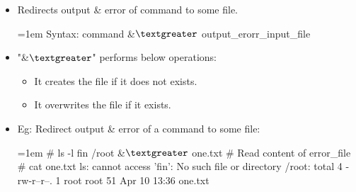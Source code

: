 \setlength{\columnsep}{3pt}
\begin{flushleft}

	\begin{itemize}
	\item Redirects output \& error of command to some file.
	\bigskip
	\begin{tcolorbox}[breakable,notitle,boxrule=-0pt,colback=pink,colframe=pink]
		\color{black}
		\font=1em
		Syntax: command \&{$\textgreater$} output\_erorr\_input\_file
		\font=4pt
	\end{tcolorbox}
	\item "\&{$\textgreater$}" performs below operations:
	\begin{itemize}
		\item It creates the file if it does not exists.
		\item It overwrites the file if it exists.
	\end{itemize}
	\item
	Eg: Redirect output \& error of a command to some file:
	\bigskip
	\begin{tcolorbox}[breakable,notitle,boxrule=-0pt,colback=black,colframe=black]
		\color{green}
		\font=1em
		\# ls -l fin /root \&{$\textgreater$} one.txt
		\newline
		\newline
		\color{yellow}
		\# Read content of error\_file
		\color{green}
		\newline
		\# cat one.txt
		\newline
		\color{white}
		ls: cannot access 'fin': No such file or directory
		\newline
		/root:
		\color{white}
		\newline
		total 4
		\color{white}
		\newline
		\color{white} -rw-r--r--. 1 root root 51 Apr 10 13:36 one.txt
		\font=4pt
	\end{tcolorbox}
\end{itemize}
	

	
\end{flushleft}
\newpage


